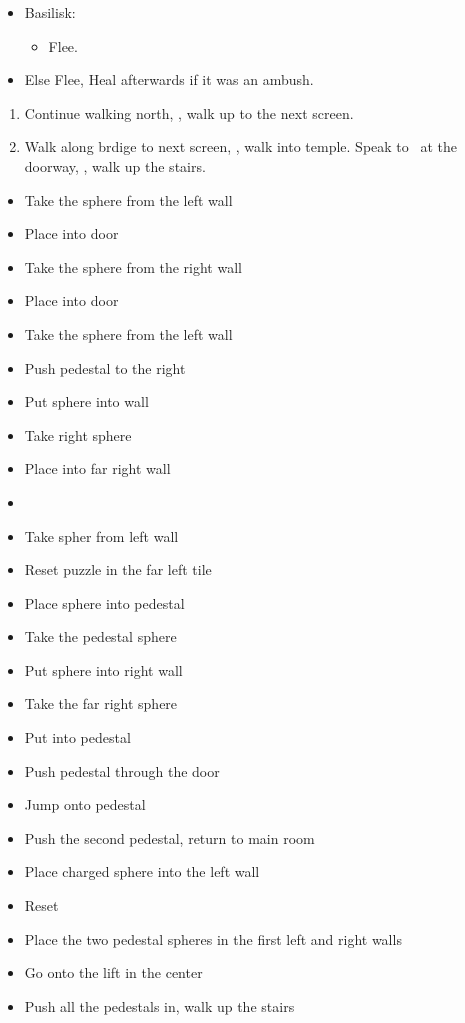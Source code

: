 \begin{encounters}
	\begin{itemize}
		\item Basilisk:
		\begin{itemize}
			\kimahrif Lancet Basilisk, learn \textbf{Stone Breath}
			\item Flee.
		\end{itemize}
		\item Else Flee,  Heal afterwards if it was an ambush.
	\end{itemize}
\end{encounters}
\begin{enumerate}[resume]
	\item Continue walking north, \sd, walk up to the next screen.
	\item Walk along brdige to next screen, \sd, walk into temple. Speak to \auron\ at the doorway, \sd, walk up the stairs.
\end{enumerate}
\vfill
\begin{trial}
\begin{itemize}
	\item Take the sphere from the left wall
	\item Place into door
	\item Take the sphere from the right wall
	\item Place into door
	\item Take the sphere from the left wall
	\item Push pedestal to the right
	\item Put sphere into wall
	\item Take right sphere
	\item Place into far right wall
	\item \cs
	\item Take spher from left wall
	\item Reset puzzle in the far left tile
	\item Place sphere into pedestal
	\item Take the pedestal sphere
	\item Put sphere into right wall
	\item Take the far right sphere
	\item Put into pedestal
	\item Push pedestal through the door
	\item Jump onto pedestal
	\item Push the second pedestal, return to main room
	\item Place charged sphere into the left wall
	\item Reset
	\item Place the two pedestal spheres in the first left and right walls
	\item Go onto the lift in the center
	\item Push all the pedestals in, walk up the stairs
\end{itemize}
\end{trial}
